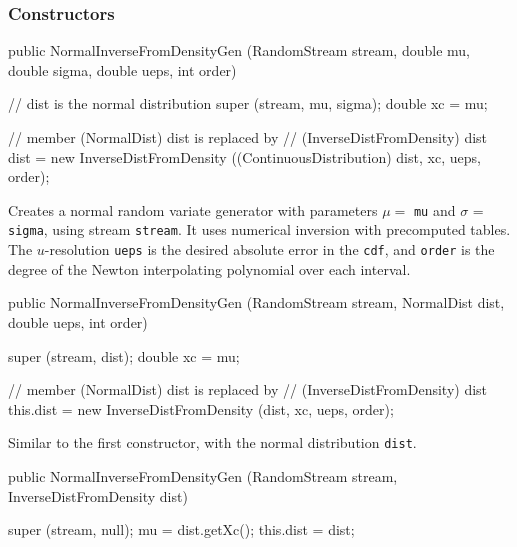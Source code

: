 \subsubsection* {Constructors}
\begin{code}

   public NormalInverseFromDensityGen (RandomStream stream, double mu, 
                                       double sigma, double ueps, int order) \begin{hide} {
      // dist is the normal distribution
      super (stream, mu, sigma);
      double xc = mu;

      // member (NormalDist) dist is replaced by 
      // (InverseDistFromDensity) dist
      dist = new InverseDistFromDensity ((ContinuousDistribution) dist,
                                         xc, ueps, order);
    }\end{hide}
\end{code} 
\begin{tabb} Creates a normal random variate generator with parameters 
$\mu=$ \texttt{mu} and $\sigma $ = \texttt{sigma}, using stream \texttt{stream}.
It uses numerical inversion with precomputed tables.
The $u$-resolution \texttt{ueps} is the desired absolute error in the 
\texttt{cdf}, and \texttt{order} is the degree of the Newton interpolating 
polynomial over each interval.
\end{tabb}
\begin{code}

   public NormalInverseFromDensityGen (RandomStream stream, NormalDist dist,
                                       double ueps, int order) \begin{hide} {
      super (stream, dist);
      double xc = mu;

      // member (NormalDist) dist is replaced by 
      // (InverseDistFromDensity) dist
      this.dist = new InverseDistFromDensity (dist, xc, ueps, order);
   } \end{hide}
\end{code}
 \begin{tabb}  Similar to the first constructor, with the normal 
   distribution \texttt{dist}.  
 \end{tabb}
\begin{code}

   public NormalInverseFromDensityGen (RandomStream stream, 
                                       InverseDistFromDensity dist) \begin{hide} {
      super (stream, null);
      mu = dist.getXc();
      this.dist = dist;
   } \end{hide}
\end{code}
